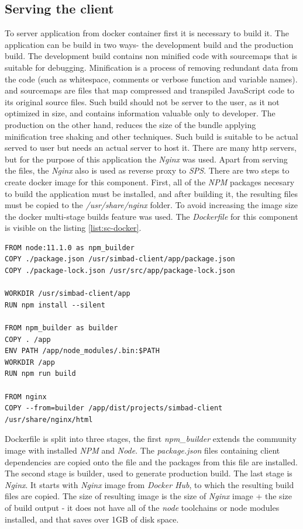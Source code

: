 \subsection{Serving the client}
To server application from docker container first it is necessary to build it. The application can be build in two ways- the development build and the production build. The development build contains non minified code with sourcemaps that is suitable for debugging.  Minification is a process of removing redundant data from the code (such as whitespace, comments or verbose function and variable names). and sourcemaps are files that map compressed and transpiled JavaScript code to its original source files. Such build should not be server to the user, as it not optimized in size, and contains information valuable only to developer. The production on the other hand, reduces the size of the bundle applying minification tree shaking and other techniques. Such build is suitable to be actual served to user but needs an actual server to host it. There are many http servers, but for the purpose of this application the \textit{Nginx} was used. Apart from serving the files, the \textit{Nginx} also is used as reverse proxy to \textit{SPS}. 
There are two steps to create docker image for this component. First, all of the \textit{NPM} packages necesary to build the application must be installed, and after building it, the resulting files must be copied to the \textit{ /usr/share/nginx} folder. To avoid increasing the image size the docker multi-stage builds feature was used. The \textit{Dockerfile} for this component is visible on the listing \ref{list:sc-docker}.
\begin{lstlisting}[label=list:sc-docker,caption=Dockerfile used to build \textit{SimBaD-Client}, basicstyle=\footnotesize\ttfamily]
FROM node:11.1.0 as npm_builder
COPY ./package.json /usr/simbad-client/app/package.json
COPY ./package-lock.json /usr/src/app/package-lock.json

WORKDIR /usr/simbad-client/app
RUN npm install --silent

FROM npm_builder as builder
COPY . /app
ENV PATH /app/node_modules/.bin:$PATH
WORKDIR /app
RUN npm run build

FROM nginx
COPY --from=builder /app/dist/projects/simbad-client /usr/share/nginx/html
\end{lstlisting}
Dockerfile is split into three stages, the first \textit{npm\_builder} extends the community image with installed \textit{NPM} and \textit{Node}.
The \textit{package.json} files containing client dependencies are copied onto the file and the packages from this file are installed. The second stage is builder, used to generate production build. The last stage is \textit{Nginx}. It starts with \textit{Nginx} image from \textit{Docker Hub}, to which the resulting build files are copied. The size of resulting image is the size of \textit{Nginx} image + the size of build output - it does not have all of the \textit{node} toolchains or node modules installed, and that saves over 1GB of disk space.
